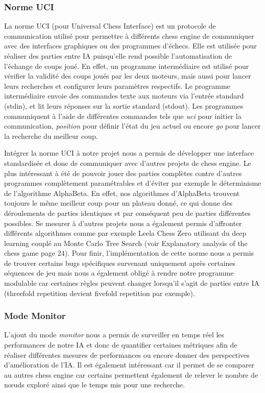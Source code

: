 \documentclass{article}
\begin{document}
\subsubsection{Norme UCI}
La norme UCI (pour Universal Chess Interface) est un protocole de communication utilisé pour permettre à différents chess engine de communiquer avec des interfaces graphiques ou des programmes d’échecs.
Elle est utilisée pour réaliser des parties entre IA puisqu'elle rend possible l'automatisation de l'échange de coups joué. En effet, un programme intermédiaire est utilisé pour vérifier la validité des
coups joués par les deux moteurs, mais aussi pour lancer leurs recherches et configurer leurs paramètres respectifs. Le programme intermédiaire envoie des commandes texte aux moteurs via l’entrée standard (stdin), 
et lit leurs réponses sur la sortie standard (stdout). Les programmes communiquent à l'aide de différentes commandes tels que \textit{uci} pour initier la communication, \textit{position} pour définir 
l'état du jeu actuel ou encore \textit{go} pour lancer la recherche du meilleur coup.

Intégrer la norme UCI à notre projet nous a permis de développer une interface standardisée et donc de communiquer avec d'autres projets de chess engine.
Le plus intéressant à été de pouvoir jouer des parties complètes contre d'autres programmes complètement paramétrables et d'éviter par exemple le déterminisme
de l'algorithme AlphaBeta. En effet, nos algorithmes d'AlphaBeta trouvent toujours le même meilleur coup pour un plateau donné, ce qui donne des déroulements de parties
identiques et par conséquent peu de parties différentes possibles. Se mesurer à d'autres projets nous a également permis d'affronter différents algorithmes comme par exemple
Leela Chess Zero utilisant du deep learning couplé au Monte Carlo Tree Search (voir Explanatory analysis of the chess game \cite{GameEngine} page 24).
Pour finir, l'implémentation de cette norme nous a permis de trouver certains bugs spécifiques survenant uniquement après certaines séquences de jeu mais nous a également
obligé à rendre notre programme modulable car certaines règles peuvent changer lorsqu'il s'agit de parties entre IA (threefold repetition devient fivefold repetition par exemple).
\subsubsection{Mode Monitor}
L'ajout du mode \textit{monitor} nous a permis de surveiller en temps réel les performances de notre IA et donc de quantifier certaines métriques afin de réaliser différentes mesures de
performances ou encore donner des perspectives d'amélioration de l'IA. Il est également intéressant car il permet de se comparer au autres chess engine car certains permettent également 
de relever le nombre de nœuds exploré ainsi que le temps mis pour une recherche.
\end{document}

